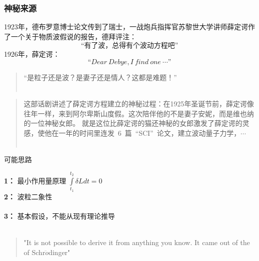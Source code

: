 \begin{frame}
    \frametitle{神秘来源}
    \begin{itemize}
        \Item 1923年，德布罗意博士论文传到了瑞士，一战炮兵指挥官苏黎世大学讲师薛定谔作了一个关于物质波假说的报告，德拜评注：\\
        $$\text{“有了波，总得有个波动方程吧”}$$
        \Item 1926年，薛定谔：
        $$“Dear~Debye, I~find~one~\cdots”$$
    \end{itemize}            
\end{frame}

\begin{frame}
    \begin{alertblock} {}  
    \begin{quote}
        “是粒子还是波？是妻子还是情人？这都是难题！” \\
        ~~\\
    \end{quote}  
    \begin{quote}    
    这部话剧讲述了薛定谔方程建立的神秘过程：在1925年圣诞节前，薛定谔像往年一样，来到阿尔卑斯山度假。这次陪伴他的不是妻子安妮，而是维也纳的一位神秘女郎。
    就是这位比薛定谔的猫还神秘的女郎激发了薛定谔的灵感，使他在一年的时间里连发~6~篇~“SCI”~论文，建立波动量子力学，$\cdots$\\
    ~~\\
    \end{quote} 
    \end{alertblock}   
\end{frame}

\begin{frame}
	\begin{alertblock} {可能思路}  
		\begin{itemize}
			\Item 	\textbf{1：}  最小作用量原理 $\int\limits_{t_1}^{t_2} \delta L d t =0 $\\ 
			\Item 	\textbf{2：}  波粒二象性\\ 
			~\\ 
			\Item 	\textbf{3：}  基本假设，不能从现有理论推导\\
            ~\\ 
            \begin{quote}
            "It is not possible to derive it from anything you know. It came out of the \alert{\faHeartbeat} of Schr$\ddot{o}$dinger"\\
            \end{quote}
		\end{itemize}
	\end{alertblock}
\end{frame}


